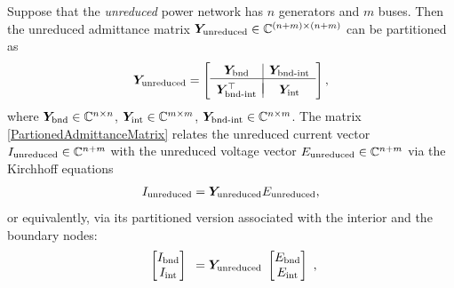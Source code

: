 \documentclass[10pt,twocolumn]{IEEEtran}
\begin{document}


Suppose that the \emph{unreduced} power network has $n$ generators and $m$ buses. Then the unreduced admittance matrix $\bm{Y}_{\rm{unreduced}}\in \mathbb{C}^{(n+m)\times(n+m)}$ can be partitioned as
\begin{align}
\bm{Y}_{\rm{unreduced}} = \begin{bmatrix} 
\begin{array}{c|c}
\bm{Y}_{\rm{bnd}} & \bm{Y}_{\rm{bnd{\text{-}}int}} \\
\hline\vspace*{-0.12in}\\
\bm{Y}_{\rm{bnd{\text{-}}int}}^{\top} & \bm{Y}_{\rm{int}}
\end{array}	
 \end{bmatrix},
\label{PartionedAdmittanceMatrix}	
\end{align} 
where $\bm{Y}_{\rm{bnd}}\in\mathbb{C}^{n\times n}$, $\bm{Y}_{\rm{int}}\in\mathbb{C}^{m\times m}$, $\bm{Y}_{\rm{bnd{\text{-}}int}}\in\mathbb{C}^{n\times m}$. The matrix \eqref{PartionedAdmittanceMatrix} relates the unreduced current vector $I_{\rm{unreduced}}\in\mathbb{C}^{n+m}$ with the unreduced voltage vector $E_{\rm{unreduced}}\in\mathbb{C}^{n+m}$ via the Kirchhoff equations
\begin{align}
I_{\rm{unreduced}} = \bm{Y}_{\rm{unreduced}} E_{\rm{unreduced}},
\label{DefUnreducedY}	
\end{align}
or equivalently, via its partitioned version associated with the interior and the boundary nodes:
\begin{align}
\begin{array}{c}
\begin{bmatrix}
I_{\rm{bnd}}\\
I_{\rm{int}} 	
\end{bmatrix}	
\end{array} = \bm{Y}_{\rm{unreduced}} \begin{array}{c}
\begin{bmatrix}
E_{\rm{bnd}}\\
E_{\rm{int}} 	
\end{bmatrix}	
\end{array},
\label{PartitionedKirchoffEquation}	
\end{align}
\end{document}
